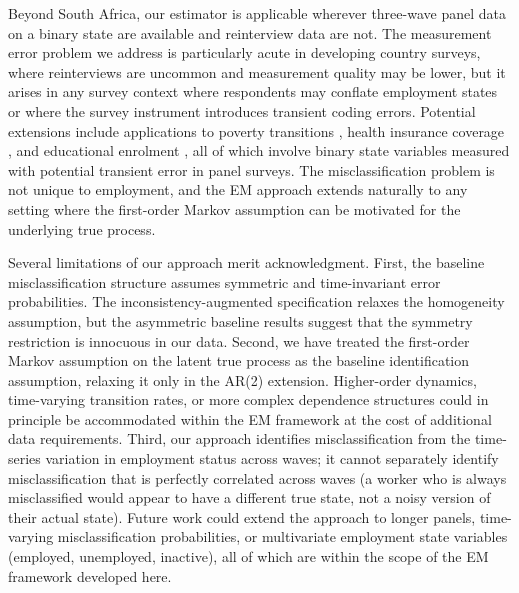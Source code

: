 Beyond South Africa, our estimator is applicable wherever three-wave panel data
on a binary state are available and reinterview data are not. The measurement
error problem we address is particularly acute in developing country surveys,
where reinterviews are uncommon and measurement quality may be lower, but it
arises in any survey context where respondents may conflate employment states
or where the survey instrument introduces transient coding errors. Potential
extensions include applications to poverty transitions \citep{Bigsten2008},
health insurance coverage \citep{van2017critique}, and educational enrolment
\citep{fredriksson1997economic}, all of which involve binary state variables
measured with potential transient error in panel surveys. The misclassification
problem is not unique to employment, and the EM approach extends naturally to
any setting where the first-order Markov assumption can be motivated for the
underlying true process.

Several limitations of our approach merit acknowledgment. First, the baseline
misclassification structure assumes symmetric and time-invariant error
probabilities. The inconsistency-augmented specification relaxes the
homogeneity assumption, but the asymmetric baseline results suggest that the
symmetry restriction is innocuous in our data. Second, we have treated the
first-order Markov assumption on the latent true process as the baseline
identification assumption, relaxing it only in the AR(2) extension. Higher-order
dynamics, time-varying transition rates, or more complex dependence structures
could in principle be accommodated within the EM framework at the cost of
additional data requirements. Third, our approach identifies misclassification
from the time-series variation in employment status across waves; it cannot
separately identify misclassification that is perfectly correlated across waves
(a worker who is always misclassified would appear to have a different true
state, not a noisy version of their actual state). Future work could extend
the approach to longer panels, time-varying misclassification probabilities,
or multivariate employment state variables (employed, unemployed, inactive),
all of which are within the scope of the EM framework developed here.
